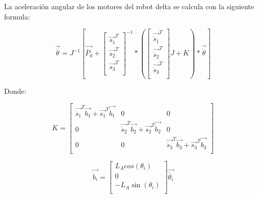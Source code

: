        La aceleración angular de los motores del robot delta se calcula con la siguiente formula:
        
        
        \begin{equation}
                    \overrightarrow{\ddot{ \theta }}=J^{-1} \left[ \overrightarrow{\ddot{P_{0}}}+ \left[ \begin{matrix}
                \overrightarrow{s_{1}}^{T}\\
                \overrightarrow{s_{2}}^{T}\\
                \overrightarrow{s_{3}}^{T}\\
                \end{matrix}
                 \right] ^{-1} \ast \left(  \left[ \begin{matrix}
                \overrightarrow{\dot{s}_{1}}^{T}\\
                \overrightarrow{\dot{s}_{2}}^{T}\\
                \overrightarrow{\dot{s}_{3}}^{T}\\
                \end{matrix}
                 \right]  J+K \right) \ast\overrightarrow{\dot{ \theta }} \right]
            \label{eq:cap4_MB_16}
        \end{equation} 

        Donde: 

        \begin{equation}
                 K= \left[ \begin{matrix}
                \overrightarrow{\dot{s}_{1}}^{T}\overrightarrow{b_{1}}+\overrightarrow{s_{1}}^{T}\overrightarrow{\dot{b}_{1}}  &  0  &  0\\
                0  &  \overrightarrow{\dot{s}_{2}}^{T}\overrightarrow{b_{2}}+\overrightarrow{s_{2}}^{T}\overrightarrow{\dot{b}_{2}}  &  0\\
                0  &  0  &  \overrightarrow{\dot{s}_{3}}^{T}\overrightarrow{b_{3}}+\overrightarrow{s_{3}}^{T}\overrightarrow{\dot{b}_{3}}\\
                \end{matrix}
                 \right]  
            \label{eq:cap4_MB_17}
        \end{equation} 
        
        \begin{equation}
                  \overrightarrow{\dot{b}_{i}}= \left[ \begin{matrix}
                L_{A} cos⁡ \left(  \theta _{i} \right) \\
                0\\
                - L_{A}\sin ⁡ \left(  \theta _{i} \right) \\
                \end{matrix}
                 \right] \overrightarrow{\dot{ \theta _{i}}}  
            \label{eq:cap4_MB_18}
        \end{equation} 
        
